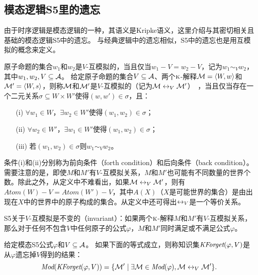 \subsection{模态逻辑S5里的遗忘}\label{chapter:sub:s5forgetting}

由于时序逻辑是模态逻辑的一种，其语义是Kripke语义，这里介绍与其密切相关且基础的模态逻辑S5中的遗忘。
与经典逻辑中的遗忘相似，S5中的遗忘也是用互模拟的概念来定义。

原子命题的集合$w_1$和$w_2$是$V$-互模拟的，当且仅当$w_1 -V = w_2 -V$，记为$w_1 \sim_V w_2$，其中$w_1, w_2, V \subseteq {\cal A}$。
给定原子命题的集合$V\subseteq {\cal A}$、两个$\textsc{k}$-解释${\cal M}={\langle{W,w}\rangle}$和${\cal M}'={\langle{W,s}\rangle}$，则称${\cal M}$和${\cal M}'$是$V$-互模拟的（记为${\cal M} \leftrightarrow_{V} {\cal M}'$）~\cite{Zhang2008Properties}，当且仅当存在一个二元关系$\sigma \subseteq W \times W'$使得$(w,w') \in \sigma$，且：
\begin{itemize}
	\item[(i)] $\forall w_1 \in W$，$\exists w_2\in W'$使得$(w_1, w_2) \in \sigma$；
	\item[(ii)] $\forall w_2 \in W'$，$\exists w_1\in W'$使得$(w_1, w_2) \in \sigma$；
	\item[(iii)] 若$(w_1, w_2) \in \sigma$则$w_1\sim_V w_2$。
\end{itemize}

条件(i)和(ii)分别称为前向条件（forth condition）和后向条件（back condition）。需要注意的是，即使$M$和$M'$有$V$-互模拟关系，$M$和$M'$也可能有不同数量的世界个数。除此之外，从定义中不难看出，如果${\cal M} \leftrightarrow_{V} {\cal M}'$，则有$Atom(W)-V=Atom(W' )-V$，其中$A(X)$（$X$是可能世界的集合）是由出现在$X$中的世界中的原子构成的集合。从定义中还可得出$\leftrightarrow_V$是一个等价关系。

S5关于$V$-互模拟是不变的（invariant）：如果两个$\textsc{k}$-解释$M$和$M'$有$V$-互模拟关系，那么对于任何不包含$V$中任何原子的公式$\varphi$，$M$和$M'$同时满足或不满足公式$\varphi$。

\begin{definition}\label{def:s5forgetting}
	给定模态S5公式$\varphi$和$V\subseteq {\cal A}$。
	如果下面的等式成立，则称知识集$\textit{KForget}(\varphi,V)$是从$\varphi$遗忘掉$V$得到的结果：
	$$\textit{Mod}(\textit{KForget}(\varphi, V)) = \{{\cal M}' \mid \exists {\cal M} \in \textit{Mod}(\varphi), {\cal M} \leftrightarrow_V {\cal M}'\}.$$
\end{definition}

